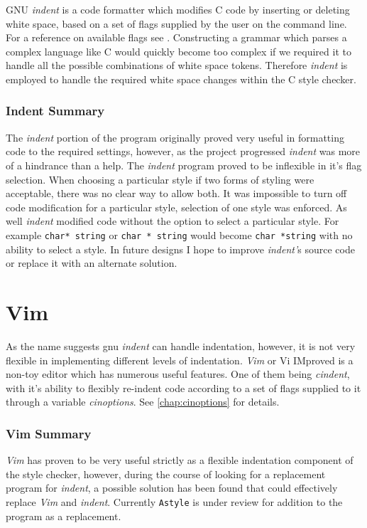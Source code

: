 GNU \emph{indent} is a code formatter which modifies C code by inserting or deleting
white space, based on a set of flags supplied by the user on the command line.
For a reference on available flags see \citep*{INDENT}.
Constructing a grammar which parses a complex language like C would quickly 
become too complex if we required it to handle all the possible combinations of
white space tokens. Therefore \emph{indent} is employed to handle the required 
white space changes within the C style checker. 

\subsubsection{Indent Summary}
The \emph{indent} portion of the program originally proved very useful in 
formatting code to the required settings, however, as the project progressed 
\emph{indent} was more of a hindrance than a help. The \emph{indent} program 
proved to be inflexible in it's flag selection. When choosing a particular 
style if two forms of styling were acceptable, there was no clear way to allow
both. It was impossible to turn off code modification for a particular style, 
selection of one style was enforced.  As well \emph{indent} modified code without the 
option to select a particular style. For example \verb|char* string| or 
\verb|char * string| would become \verb|char *string| with no ability to 
select a style. In future designs I hope to improve \emph{indent'}s source 
code or replace it with an alternate solution.




\section{Vim}

As the name suggests gnu \emph{indent} can handle indentation, however, it is not 
very flexible in implementing different levels of indentation.
\emph{Vim} or Vi IMproved is a non-toy editor which has numerous useful features.
One of them being \emph{cindent}, with it's ability to flexibly re-indent code 
according to a set of flags supplied to it through a variable 
\emph{cinoptions}. See \autoref{chap:cinoptions} for details.

\subsubsection{Vim Summary}
\emph{Vim} has proven to be very useful strictly as a flexible indentation 
component of the style checker, however, during the course of looking for a 
replacement program for \emph{indent}, a possible solution has been found that 
could effectively replace \emph{Vim} and \emph{indent}. Currently 
\texttt{Astyle} is under review for addition to the program as a replacement.


